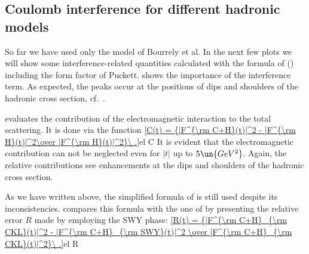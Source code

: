 



\subsection[int mod]{Coulomb interference for different hadronic models}

So far we have used only the model of Bourrely et al. In the next few plots we will show some interference-related quantities calculated with the formula of \KaL{} () including the form factor of Puckett.  shows the importance of the interference term. As expected, the peaks occur at the positions of dips and shoulders of the hadronic cross section, cf.~.

 evaluates the contribution of the electromagnetic interaction to the total scattering. It is done via the function
\eqref{C(t) = {|F^{\rm C+H}(t)|^2 - |F^{\rm H}(t)|^2\over |F^{\rm H}(t)|^2}\ .}{el C}
It is evident that the electromagnetic contribution can not be neglected even for $|t|$ up to $5\un{GeV^2}$. Again, the relative contributions see enhancements at the dips and shoulders of the hadronic cross section.



As we have written above, the simplified formula of \WaY{} is still used despite its inconsistencies.  compares this formula with the one of \KaL{} by presenting the relative error $R$ made by employing the SWY phase:
\eqref{R(t) = {|F^{\rm C+H}_{\rm CKL}(t)|^2 - |F^{\rm C+H}_{\rm SWY}(t)|^2 \over |F^{\rm C+H}_{\rm CKL}(t)|^2}\ .}{el R}





